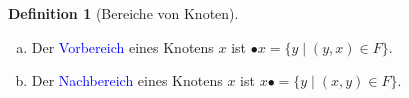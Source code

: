 \documentclass{scrreprt}
\theoremstyle{definition}
\newtheorem{Definition}{Definition}[section]
\theoremstyle{example}
\theoremstyle{algorithm}
\begin{document}
\begin{Definition}[Bereiche von Knoten]
\noindent
\begin{enumerate}[(a)]
\item
Der \textcolor{blue}{Vorbereich} eines Knotens $x$ ist $\bullet x = \{y \mid (y,x) \in F\}$.\item
Der \textcolor{blue}{Nachbereich} eines Knotens $x$ ist $x\bullet = \{y \mid (x,y) \in F\}$.
\end{enumerate}
\end{Definition}
\end{document}
